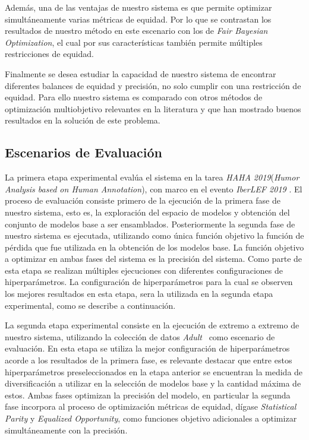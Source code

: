 Además, una de las ventajas de nuestro sistema es que permite optimizar simultáneamente varias métricas de equidad.
Por lo que se contrastan los resultados de nuestro método en este escenario con los de \emph{Fair Bayesian Optimization}, el cual por sus características también permite múltiples restricciones de equidad.

Finalmente se desea estudiar la capacidad de nuestro sistema de encontrar diferentes balances de equidad y precisión, no solo cumplir con una restricción de equidad.
Para ello nuestro sistema es comparado con otros métodos de optimización multiobjetivo relevantes en la literatura y que han mostrado buenos resultados en la solución de este problema.

\subsection{Escenarios de Evaluación}\label{section:evaluation-scenaries}

La primera etapa experimental evalúa el sistema en la tarea \emph{HAHA 2019}(\textit{Humor Analysis based on Human Annotation}), con marco en el evento \textit{IberLEF 2019} \parencite{chiruzzo2019overview}.
El proceso de evaluación consiste primero de la ejecución de la primera fase de nuestro sistema, esto es, la exploración del espacio de modelos y obtención del conjunto de modelos base a ser ensamblados.
Posteriormente la segunda fase de nuestro sistema es ejecutada, utilizando como única función objetivo la función de pérdida que fue utilizada en la obtención de los modelos base.
La función objetivo a optimizar en ambas fases del sistema es la precisión del sistema.
Como parte de esta etapa se realizan múltiples ejecuciones con diferentes configuraciones de hiperparámetros.
La configuración de hiperparámetros para la cual se observen los mejores resultados en esta etapa, sera la utilizada en la segunda etapa experimental, como se describe a continuación.

La segunda etapa experimental consiste en la ejecución de extremo a extremo de nuestro sistema, utilizando la colección de datos \emph{Adult}~\parencite{ucidata} como escenario de evaluación.
En esta etapa se utiliza la mejor configuración de hiperparámetros acorde a los resultados de la primera fase, es relevante destacar que entre estos hiperparámetros preseleccionados en la etapa anterior se encuentran la medida de diversificación a utilizar en la selección de modelos base y la cantidad máxima de estos.
Ambas fases optimizan la precisión del modelo, en particular la segunda fase incorpora al proceso de optimización métricas de equidad, dígase \emph{Statistical Parity} y \emph{Equalized Opportunity}, como funciones objetivo adicionales a optimizar simultáneamente con la precisión.

